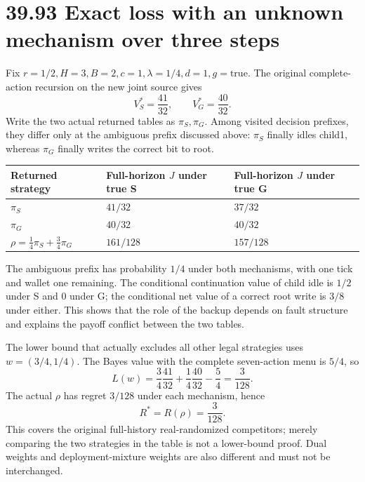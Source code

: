 \documentclass[
  english,
  11pt,
  oneside]{book}
\newcounter{none} %
\begin{document}
\section{39.93 Exact loss with an unknown mechanism over three steps}\label{exact-loss-with-an-unknown-mechanism-over-three-steps}

Fix \(r=1/2,H=3,B=2,c=1,\lambda=1/4,d=1,g=\mathrm{true}\). The original complete-action recursion on the new joint source gives \[V_S^*=\frac{41}{32},\qquad V_G^*=\frac{40}{32}.\] Write the two actual returned tables as \(\pi_S,\pi_G\). Among visited decision prefixes, they differ only at the ambiguous prefix discussed above: \(\pi_S\) finally idles child1, whereas \(\pi_G\) finally writes the correct bit to root.

{\def\LTcaptype{none} %
\begin{longtable}[]{@{}
  >{\raggedright\arraybackslash}p{}
  >{\raggedleft\arraybackslash}p{}
  >{\raggedleft\arraybackslash}p{}@{}}
\toprule\noalign{}
\begin{minipage}[b]{\linewidth}\raggedright
Returned strategy
\end{minipage} & \begin{minipage}[b]{\linewidth}\raggedleft
Full-horizon \(J\) under true S
\end{minipage} & \begin{minipage}[b]{\linewidth}\raggedleft
Full-horizon \(J\) under true G
\end{minipage} \\
\midrule\noalign{}
\endhead
\bottomrule\noalign{}
\endlastfoot
\(\pi_S\) & \(41/32\) & \(37/32\) \\
\(\pi_G\) & \(40/32\) & \(40/32\) \\
\(\rho=\tfrac14\pi_S+\tfrac34\pi_G\) & \(161/128\) & \(157/128\) \\
\end{longtable}
}

The ambiguous prefix has probability \(1/4\) under both mechanisms, with one tick and wallet one remaining. The conditional continuation value of child idle is \(1/2\) under S and 0 under G; the conditional net value of a correct root write is \(3/8\) under either. This shows that the role of the backup depends on fault structure and explains the payoff conflict between the two tables.

The lower bound that actually excludes all other legal strategies uses \(w=(3/4,1/4)\). The Bayes value with the complete seven-action menu is \(5/4\), so \[L(w)=\frac34\frac{41}{32}+\frac14\frac{40}{32}-\frac54=\frac3{128}.\] The actual \(\rho\) has regret \(3/128\) under each mechanism, hence \[R^*=R(\rho)=\frac3{128}.\] This covers the original full-history real-randomized competitors; merely comparing the two strategies in the table is not a lower-bound proof. Dual weights and deployment-mixture weights are also different and must not be interchanged.
\end{document}
